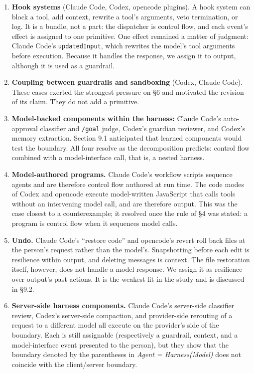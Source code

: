 \begin{enumerate}
\def\labelenumi{\arabic{enumi}.}
\tightlist
\item
  \textbf{Hook systems} (Claude Code, Codex, opencode plugins). A hook system can block a tool, add context, rewrite a tool's arguments, veto termination, or log. It is a bundle, not a part: the dispatcher is control flow, and each event's effect is assigned to one primitive. One effect remained a matter of judgment: Claude Code's \passthrough{\lstinline!updatedInput!}, which rewrites the model's tool arguments before execution. Because it handles the response, we assign it to output, although it is used as a guardrail.
\item
  \textbf{Coupling between guardrails and sandboxing} (Codex, Claude Code). These cases exerted the strongest pressure on §6 and motivated the revision of its claim. They do not add a primitive.
\item
  \textbf{Model-backed components within the harness:} Claude Code's auto-approval classifier and \passthrough{\lstinline!/goal!} judge, Codex's guardian reviewer, and Codex's memory extraction. Section 9.1 anticipated that learned components would test the boundary. All four resolve as the decomposition predicts: control flow combined with a model-interface call, that is, a nested harness.
\item
  \textbf{Model-authored programs.} Claude Code's workflow scripts sequence agents and are therefore control flow authored at run time. The code modes of Codex and opencode execute model-written JavaScript that calls tools without an intervening model call, and are therefore output. This was the case closest to a counterexample; it resolved once the rule of §4 was stated: a program is control flow when it sequences model calls.
\item
  \textbf{Undo.} Claude Code's ``restore code'' and opencode's revert roll back files at the person's request rather than the model's. Snapshotting before each edit is resilience within output, and deleting messages is context. The file restoration itself, however, does not handle a model response. We assign it as resilience over output's past actions. It is the weakest fit in the study and is discussed in §9.2.
\item
  \textbf{Server-side harness components.} Claude Code's server-side classifier review, Codex's server-side compaction, and provider-side rerouting of a request to a different model all execute on the provider's side of the boundary. Each is still assignable (respectively a guardrail, context, and a model-interface event presented to the person), but they show that the boundary denoted by the parentheses in \emph{Agent = Harness(Model)} does not coincide with the client/server boundary.

\end{enumerate}

